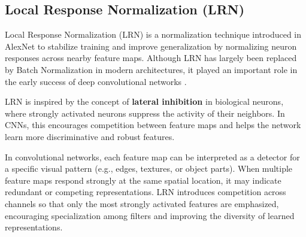 \documentclass{article}
\begin{document}


\subsection{Local Response Normalization (LRN)}

Local Response Normalization (LRN) is a normalization technique introduced in AlexNet to stabilize training and improve generalization by normalizing neuron responses across nearby feature maps. Although LRN has largely been replaced by Batch Normalization in modern architectures, it played an important role in the early success of deep convolutional networks \cite{NIPS2012_c399862d}.

LRN is inspired by the concept of \textbf{lateral inhibition} in biological neurons, where strongly activated neurons suppress the activity of their neighbors. In CNNs, this encourages competition between feature maps and helps the network learn more discriminative and robust features.

In convolutional networks, each feature map can be interpreted as a detector for a specific visual pattern (e.g., edges, textures, or object parts). When multiple feature maps respond strongly at the same spatial location, it may indicate redundant or competing representations. LRN introduces competition across channels so that only the most strongly activated features are emphasized, encouraging specialization among filters and improving the diversity of learned representations.
\end{document}
